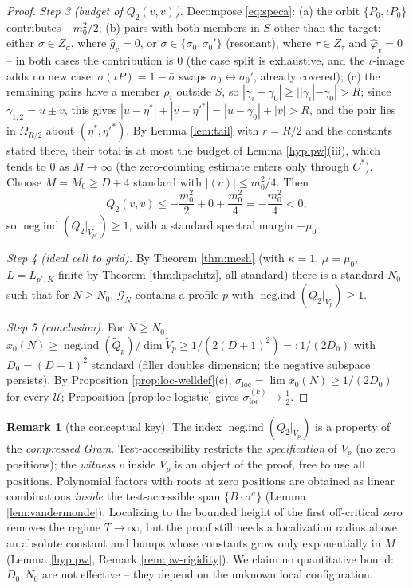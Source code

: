 \documentclass[11pt,reqno]{amsart}
\theoremstyle{definition}
\newtheorem{remark}[theorem]{Remark}
\newcommand{\negind}{\operatorname{neg.ind}}
\newcommand{\half}{\tfrac12}
\begin{document}
\begin{proof}
\emph{Step 3 (budget of \(Q_2(v,v)\)).} Decompose \eqref{eq:speca}: (a) the orbit
\(\{P_0,\iota P_0\}\) contributes \(-m_0^2/2\); (b) pairs with both members in
\(S\) other than the target: either \(\sigma\in Z_\sigma\), where
\(\hat g_v=0\), or \(\sigma\in\{\sigma_0,\sigma_0'\}\) (resonant), where
\(\tau\in Z_\tau\) and \(\hat\varphi_v=0\) -- in both cases the contribution is
\(0\) (the case split is exhaustive, and the \(\iota\)-image adds no new case:
\(\sigma(\iota P)=1-\bar\sigma\) swaps \(\sigma_0\leftrightarrow\sigma_0'\),
already covered); (c) the remaining pairs have a member \(\rho_i\) outside \(S\), so
\(|\gamma_i-\gamma_0|\geq||\gamma_i|-\gamma_0|>R\); since \(\gamma_{1,2}=u\pm v\), this gives
\(|u-\eta^*|+|v-\eta'^*|=|u-\gamma_0|+|v|>R\), and the pair lies in
\(\Omega_{R/2}\) about \((\eta^*,\eta'^*)\). By Lemma \ref{lem:tail} with
\(r=R/2\) and the constants stated there, their total is at most the budget
of Lemma \ref{hyp:pw}(iii), which tends to \(0\) as \(M\to\infty\) (the
zero-counting estimate enters only through \(C^*\)). Choose \(M=M_0\geq D+4\) standard
with \(|(c)|\leq m_0^2/4\). Then
\[
Q_2(v,v)\leq-\frac{m_0^2}{2}+0+\frac{m_0^2}{4}=-\frac{m_0^2}{4}<0,
\]
so \(\negind(Q_2|_{V_{p^*}})\geq1\), with a standard spectral margin \(-\mu_0\).

\emph{Step 4 (ideal cell to grid).} By Theorem \ref{thm:mesh} (with
\(\kappa=1\), \(\mu=\mu_0\), \(L=L_{p^*,K}\) finite by Theorem \ref{thm:lipschitz},
all standard) there is a standard \(N_0\) such that for \(N\geq N_0\),
\(\mathcal G_N\) contains a profile \(p\) with \(\negind(Q_2|_{V_p})\geq1\).

\emph{Step 5 (conclusion).} For \(N\geq N_0\),
\(x_0(N)\geq\negind(\tilde Q_p)/\dim\tilde V_p\geq1/(2(D+1)^2)=:1/(2D_0)\) with
\(D_0=(D+1)^2\) standard (filler doubles dimension; the negative subspace
persists).
By Proposition \ref{prop:loc-welldef}(c),
\(\sigma_{\mathrm{loc}}=\lim x_0(N)\geq1/(2D_0)\) for every \(\mathcal U\);
Proposition \ref{prop:loc-logistic} gives \(\sigma_{\mathrm{loc}}^{(k)}\to\half\).
\end{proof}

\begin{remark}[the conceptual key]
\label{rem:key}
The index \(\negind(Q_2|_{V_p})\) is a property of the \emph{compressed Gram}.
Test-accessibility restricts the \emph{specification} of \(V_p\) (no zero
positions); the \emph{witness} \(v\) inside \(V_p\) is an object of the proof,
free to use all positions. Polynomial factors with roots at zero positions are
obtained as linear combinations \emph{inside} the test-accessible span
\(\{B\cdot\sigma^a\}\) (Lemma \ref{lem:vandermonde}). Localizing to the bounded
height of the first off-critical zero removes the regime \(T\to\infty\), but
the proof still needs a localization radius above an absolute constant and
bumps whose constants grow only exponentially in \(M\) (Lemma \ref{hyp:pw},
Remark \ref{rem:pw-rigidity}). We claim no quantitative bound: \(D_0,N_0\)
are not effective -- they depend on the unknown local configuration.
\end{remark}
\end{document}
